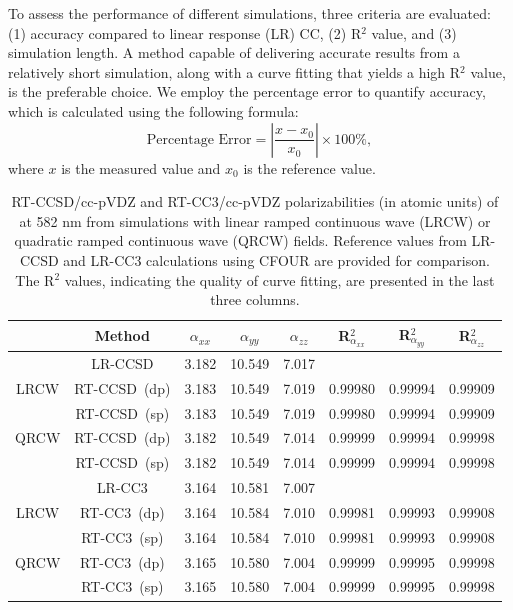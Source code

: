 To assess the performance of different simulations, three criteria are evaluated: (1) accuracy compared to linear response (LR) CC, (2) R$^{2}$ value, and (3) simulation length. A method capable of delivering accurate results from a relatively short simulation, along with a curve fitting that yields a high R$^{2}$ value, is the preferable choice. We employ the percentage error to quantify accuracy, which is calculated using the following formula:
\begin{equation}
\textrm{Percentage Error} = |\frac{x - x_{0}}{x_{0}}| \times 100\%,
\end{equation}
where $x$ is the measured value and $x_{0}$ is the reference value. 
\begin{table}
  \centering
  \caption{RT-CCSD/cc-pVDZ and RT-CC3/cc-pVDZ polarizabilities (in atomic units) of  at 582 nm from simulations with linear ramped continuous wave (LRCW) or quadratic ramped continuous wave (QRCW) fields. Reference values from LR-CCSD and LR-CC3 calculations using CFOUR are provided for comparison. The R$^{2}$ values, indicating the quality of curve fitting, are presented in the last three columns.}
  \begin{tabular}{c|c|ccc|ccc}
                                        & \textrm{Method} & $\alpha_{xx}$ & $\alpha_{yy}$ & $\alpha_{zz}$ 
                                          & R$^{2}_{\alpha_{xx}}$ & R$^{2}_{\alpha_{yy}}$ & R$^{2}_{\alpha_{zz}}$\\
                                          \hline
   & \textrm{LR-CCSD} & 3.182 & 10.549 & 7.017 & & &\\  
    \hline                                     
 \textrm{LRCW}  & \textrm{RT-CCSD\ (dp)} & 3.183 & 10.549 &  7.019 & 0.99980 & 0.99994 & 0.99909 \\
                           & \textrm{RT-CCSD\ (sp)} &  3.183 & 10.549 & 7.019 & 0.99980 & 0.99994 & 0.99909\\
    \cline{1-8}
  \textrm{QRCW} & \textrm{RT-CCSD\ (dp)} & 3.182 & 10.549 &  7.014 & 0.99999 & 0.99994 & 0.99998 \\
                           &\textrm{RT-CCSD\ (sp)} &  3.182 & 10.549 & 7.014 & 0.99999 & 0.99994 & 0.99998\\
    \hline\hline
   & \textrm{LR-CC3} & 3.164 & 10.581 & 7.007 & \\
    \hline
    \textrm{LRCW} &\textrm{RT-CC3\ (dp)} & 3.164 & 10.584 & 7.010 & 0.99981 & 0.99993 & 0.99908 \\
                             &\textrm{RT-CC3\ (sp)} & 3.164 & 10.584 & 7.010 & 0.99981 & 0.99993 & 0.99908 \\
    \cline{1-8}
    \textrm{QRCW} &\textrm{RT-CC3\ (dp)} & 3.165 & 10.580 & 7.004 & 0.99999 & 0.99995 & 0.99998 \\
                             &\textrm{RT-CC3\ (sp)} & 3.165 & 10.580 & 7.004 & 0.99999 & 0.99995 & 0.99998 \\
  \end{tabular}
  \label{tab:polar}
\end{table}

